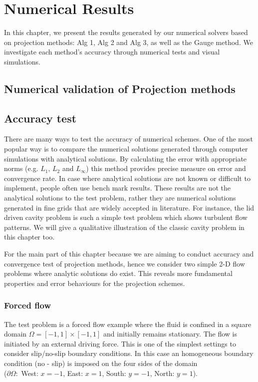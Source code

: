 \chapter{Numerical Results}
\label{chapter 6}
In this chapter, we present the results generated by our numerical solvers based on projection methods: Alg 1, Alg 2 and Alg 3, as well as the Gauge method. We investigate each method's accuracy through numerical tests and visual simulations.

\section*{Numerical validation of Projection methods}
\section{Accuracy test}
There are many ways to test the accuracy of numerical schemes. One of the most popular way is to compare the numerical solutions generated through computer simulations with analytical solutions. By calculating the error with appropriate norms (e.g. $L_1,\,L_2$ and $L_\infty$) this method provides precise measure on error and convergence rate. In case where analytical solutions are not known or difficult to implement, people often use bench mark results. These results are not the analytical solutions to the test problem, rather they are numerical solutions generated in fine grids that are widely accepted in literature. For instance, the lid driven cavity problem is such a simple test problem which shows turbulent flow patterns. We will give a qualitative illustration of the classic cavity problem in this chapter too.

For the main part of this chapter because we are aiming to conduct accuracy and convergence test of projection methods, hence we consider two simple 2-D flow problems where analytic solutions do exist. This reveals more fundamental properties and error behaviours for the projection schemes.\\

\subsection{Forced flow}
The test problem is a forced flow example where the fluid is confined in a square domain $\Omega = [-1,1] \times [-1,1]$ and initially remains stationary. The flow is initiated by an external driving force. This is one of the simplest settings to consider slip/no-slip boundary conditions. In this case an homogeneous boundary condition (no - slip) is imposed on the four sides of the domain \\
($\partial \Omega:$ West: $x = -1$, East: $x=1$, South: $y = -1$, North: $y=1$).\\

